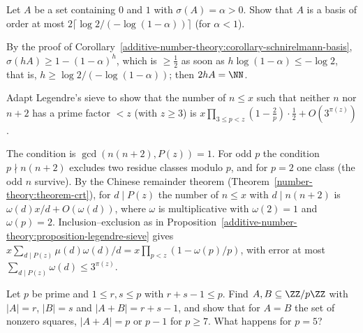 \begin{exercise}\label{additive-number-theory:exercise-schnirelmann-order}
Let $A$ be a set containing $0$ and $1$ with $\sigma(A) = \alpha > 0$. Show that $A$ is a basis of order at most $2\lceil\log 2/(-\log(1 - \alpha))\rceil$ (for $\alpha < 1$).
\end{exercise}

\begin{solution}
By the proof of Corollary~\ref{additive-number-theory:corollary-schnirelmann-basis}, $\sigma(hA) \geq 1 - (1 - \alpha)^h$, which is $\geq \frac12$ as soon as $h\log(1 - \alpha) \leq -\log 2$, that is,
$h \geq \log 2/(-\log(1 - \alpha))$; then $2hA = \NN$.
\end{solution}

\begin{exercise}\label{additive-number-theory:exercise-legendre-twin}
Adapt Legendre's sieve to show that the number of $n \leq x$ such that neither $n$ nor $n + 2$ has a prime factor $< z$ (with $z \geq 3$) is $x\prod_{3 \leq p < z}(1 - \frac2p)\cdot\frac12 + O(3^{\pi(z)})$.
\end{exercise}

\begin{solution}
The condition is $\gcd(n(n + 2), P(z)) = 1$. For odd $p$ the condition $p \nmid n(n + 2)$ excludes two residue classes modulo $p$, and for $p = 2$ one class (the odd $n$ survive). By the Chinese remainder
theorem (Theorem~\ref{number-theory:theorem-crt}), for $d \mid P(z)$ the number of $n \leq x$ with $d \mid n(n + 2)$ is $\omega(d)x/d + O(\omega(d))$, where $\omega$ is multiplicative with $\omega(2) = 1$ and
$\omega(p) = 2$. Inclusion--exclusion as in Proposition~\ref{additive-number-theory:proposition-legendre-sieve} gives $x\sum_{d \mid P(z)}\mu(d)\omega(d)/d = x\prod_{p < z}(1 - \omega(p)/p)$, with error at most
$\sum_{d \mid P(z)}\omega(d) \leq 3^{\pi(z)}$.
\end{solution}

\begin{exercise}\label{additive-number-theory:exercise-cauchy-davenport-sharp}
Let $p$ be prime and $1 \leq r, s \leq p$ with $r + s - 1 \leq p$. Find $A, B \subseteq \ZZ/p\ZZ$ with $|A| = r$, $|B| = s$ and $|A + B| = r + s - 1$, and show that for $A = B$ the set of nonzero squares, $|A + A| = p$ or
$p - 1$ for $p \geq 7$. What happens for $p = 5$?
\end{exercise}

